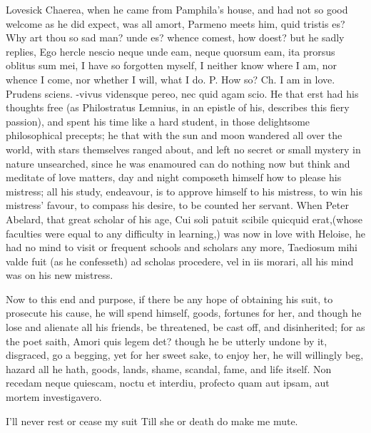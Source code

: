 Lovesick Chaerea, when he came from Pamphila's house, and had not
so good welcome as he did expect, was all amort, Parmeno meets him,
quid tristis es? Why art thou so sad man? unde es? whence comest, how
doest? but he sadly replies, Ego hercle nescio neque unde eam, neque
quorsum eam, ita prorsus oblitus sum mei, I have so forgotten myself, I
neither know where I am, nor whence I come, nor whether I will, what I
do. P. How so? Ch. I am in love. Prudens sciens. -vivus
vidensque pereo, nec quid agam scio. He that erst had his
thoughts free (as Philostratus Lemnius, in an epistle of his, describes
this fiery passion), and spent his time like a hard student, in those
delightsome philosophical precepts; he that with the sun and moon
wandered all over the world, with stars themselves ranged about, and
left no secret or small mystery in nature unsearched, since he was
enamoured can do nothing now but think and meditate of love matters,
day and night composeth himself how to please his mistress; all his
study, endeavour, is to approve himself to his mistress, to win his
mistress' favour, to compass his desire, to be counted her servant.
When Peter Abelard, that great scholar of his age, Cui soli patuit
scibile quicquid erat,(whose faculties were equal to any
difficulty in learning,) was now in love with Heloise, he had no mind
to visit or frequent schools and scholars any more, Taediosum mihi
valde fuit (as he confesseth) ad scholas procedere, vel in iis
morari, all his mind was on his new mistress.

Now to this end and purpose, if there be any hope of obtaining his
suit, to prosecute his cause, he will spend himself, goods, fortunes
for her, and though he lose and alienate all his friends, be
threatened, be cast off, and disinherited; for as the poet saith, Amori
quis legem det? though he be utterly undone by it, disgraced, go
a begging, yet for her sweet sake, to enjoy her, he will willingly beg,
hazard all he hath, goods, lands, shame, scandal, fame, and life
itself.
Non recedam neque quiescam, noctu et interdiu,
profecto quam aut ipsam, aut mortem investigavero.

I'll never rest or cease my suit
Till she or death do make me mute.

